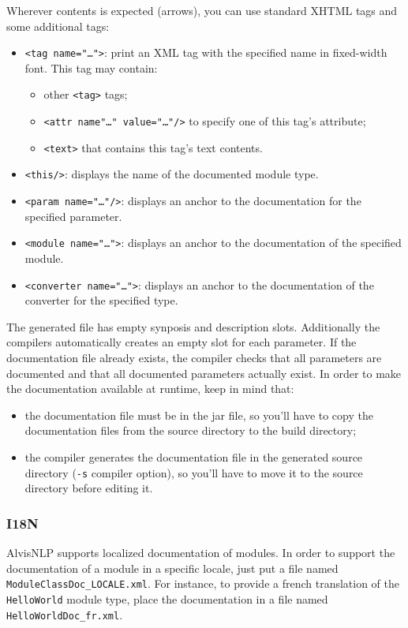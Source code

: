 \documentclass[a4paper]{article}
\begin{document}
Wherever contents is expected (arrows), you can use standard XHTML tags and some additional tags:
\begin{itemize}
\item \texttt{<tag name="\ldots">}: print an XML tag with the specified name in fixed-width font. This tag may contain:
  \begin{itemize}
  \item other \texttt{<tag>} tags;
  \item \texttt{<attr name"\ldots" value="\ldots"/>} to specify one of this tag's attribute;
  \item \texttt{<text>} that contains this tag's text contents.
  \end{itemize}
\item \texttt{<this/>}: displays the name of the documented module type.
\item \texttt{<param name="\ldots"/>}: displays an anchor to the documentation for the specified parameter.
\item \texttt{<module name="\ldots">}: displays an anchor to the documentation of the specified module.
\item \texttt{<converter name="\ldots">}: displays an anchor to the documentation of the converter for the specified type.
\end{itemize}

The generated file has empty synposis and description slots.
Additionally the compilers automatically creates an empty slot for each parameter.
If the documentation file already exists, the compiler checks that all parameters are documented and that all documented parameters actually exist.
In order to make the documentation available at runtime, keep in mind that:
\begin{itemize}
\item the documentation file must be in the jar file, so you'll have to copy the documentation files from the source directory to the build directory;
\item the compiler generates the documentation file in the generated source directory (\texttt{-s} compiler option), so you'll have to move it to the source directory before editing it.
\end{itemize}

\subsubsection{I18N}
AlvisNLP supports localized documentation of modules.
In order to support the documentation of a module in a specific locale, just put a file named \texttt{ModuleClassDoc\_LOCALE.xml}.
For instance, to provide a french translation of the \texttt{HelloWorld} module type, place the documentation in a file named \texttt{HelloWorldDoc\_fr.xml}.
\end{document}
